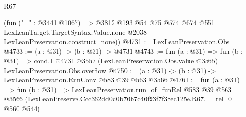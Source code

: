\begin{lexlean}{R67}
\begin{coremodule}
      (fun ("_" : @3441 @1067) =>
      @3812
        @193
        @54
        @75
        @574
        @574
        @551
        LexLeanTarget.TargetSyntax.Value.none
        @2038
        LexLeanPreservation.construct_none))
@4731 := LexLeanPreservation.Obs
@4733 := (a : @31) -> (b : @31) -> @4731
@4743 := fun (a : @31) =>
  fun (b : @31) =>
  cond.{1} @4731 @3557 (LexLeanPreservation.Obs.value @3565) LexLeanPreservation.Obs.overflow
@4750 := (a : @31) -> (b : @31) -> LexLeanPreservation.RunConv @583 @39 @563 @3566
@4761 := fun (a : @31) =>
  fun (b : @31) =>
  LexLeanPreservation.run_of_funRel
    @583
    @39
    @563
    @3566
    (LexLeanPreserve.Ccc362dd0d0b76b7c46f93f7f38ec125e.R67.__rel_0 @560 @544)
\end{coremodule}
\end{lexlean}
